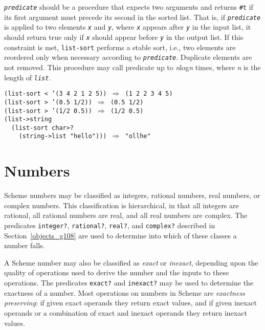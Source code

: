 \texttt{\textit{predicate}} should be a procedure that expects two arguments and
returns \texttt{\#{}t} if its first argument must precede its second in
the sorted list.
That is, if \texttt{\textit{predicate}} is applied to two elements \texttt{\textit{x}} and
\texttt{\textit{y}}, where \texttt{\textit{x}} appears after \texttt{\textit{y}} in the input list,
it should return true only if \texttt{\textit{x}} should appear before \texttt{\textit{y}}
in the output list.
If this constraint is met,
\texttt{list-sort} performs a stable sort, i.e., two elements are
reordered only when necessary according to \texttt{\textit{predicate}}.
Duplicate elements are not removed.
This procedure may call predicate up to \textit{n}log\textit{n} times, where \textit{n} is
the length of \texttt{\textit{list}}.

\begin{alltt}
(list-sort \textless{} '(3 4 2 1 2 5)) \(\Rightarrow\) (1 2 2 3 4 5)
(list-sort \textgreater{} '(0.5 1/2)) \(\Rightarrow\) (0.5 1/2)
(list-sort \textgreater{} '(1/2 0.5)) \(\Rightarrow\) (1/2 0.5)
(list-\textgreater{}string
  (list-sort char\textgreater{}?
    (string-\textgreater{}list "hello"))) \(\Rightarrow\) "ollhe"
\end{alltt}

\section{\label{objects_g110}\label{objects_h4}Numbers\label{objects_SECTNUMBERS}}



\label{objects_s63}Scheme numbers may be classified as
\label{objects_s64}integers, \label{objects_s65}rational numbers,
\label{objects_s66}real numbers, or \label{objects_s67}complex numbers.
This classification is hierarchical, in that all integers are
rational, all rational numbers are real, and all real numbers are
complex.
The predicates \label{objects_s68}\texttt{integer?}, \label{objects_s69}\texttt{rational?}, \label{objects_s70}\texttt{real?}, and
\label{objects_s71}\texttt{complex?} described in Section \ref{objects_g108} are used to
determine into which of these classes a number falls.


A Scheme number may also be classified as \label{objects_s72}\textit{exact} or
\textit{inexact}, depending upon the quality of operations used
to derive the number and the inputs to these operations.
The predicates \label{objects_s73}\texttt{exact?} and \label{objects_s74}\texttt{inexact?} may be used to
determine the exactness of a number.
Most operations on numbers in Scheme are \label{objects_s75}\textit{exactness preserving}:  if given exact operands they return exact values,
and if given inexact operands or a combination of exact and inexact
operands they return inexact values.


